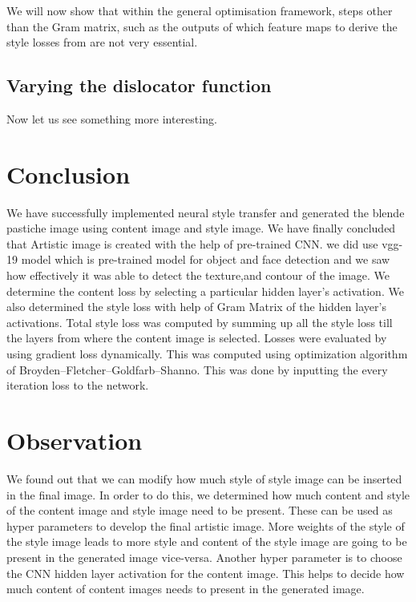 \documentclass[runningheads]{llncs}
\begin{document}
We will now show that within the general optimisation framework,
steps other than the Gram matrix, 
such as the outputs of which feature maps to derive the style 
losses from are not very essential.

\subsection{Varying the dislocator function}

Now let us see something more interesting.


\section{Conclusion}
We have successfully implemented neural style transfer and generated the blende pastiche image
using content image and style image. We have finally concluded that Artistic image is created
with the help of pre-trained CNN. we did use vgg-19 model which is pre-trained model for object 
and face detection and we saw how effectively it was able to detect the texture,and contour of
the image. We determine the content loss by selecting a particular hidden layer’s activation. 
We also determined the style loss with help of Gram Matrix of the hidden layer’s activations.
Total style loss was computed by summing up all the style loss till the layers from where the
content image is selected. Losses were evaluated by using gradient loss dynamically. This was
computed using optimization algorithm of Broyden–Fletcher–Goldfarb–Shanno. This was done by 
inputting the every iteration loss to the network.

\section{Observation}
We found out that we can modify how much style of style image can be inserted in the final image. 
In order to do this, we determined how much content and style of the content image and style image
need to be present. These can be used as hyper parameters to develop the final artistic image. 
More weights of the style of the style image leads to more style and content of the style image
are going to be present in the generated image vice-versa. Another hyper parameter is to choose
the CNN hidden layer activation for the content image. This helps to decide how much content
of content images needs to present in the generated image.
\end{document}

